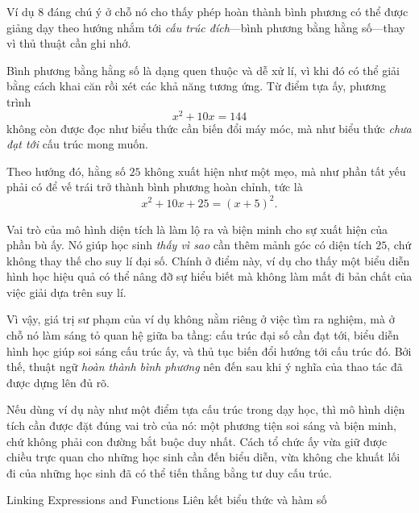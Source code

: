   {
    \vspace{.5\baselineskip}
    Ví dụ 8 đáng chú ý ở chỗ nó cho thấy phép hoàn thành bình phương có thể được giảng dạy theo hướng nhắm tới \emph{cấu trúc đích}---bình phương bằng hằng số---thay vì thủ thuật cần ghi nhớ.

    Bình phương bằng hằng số là dạng quen thuộc và dễ xử lí, vì khi đó có thể giải bằng cách khai căn rồi xét các khả năng tương ứng. Từ điểm tựa ấy, phương trình
    $$
    x^2+10x=144
    $$
    không còn được đọc như biểu thức cần biến đổi máy móc, mà như biểu thức \emph{chưa đạt tới} cấu trúc mong muốn.

    Theo hướng đó, hằng số $25$ không xuất hiện như một mẹo, mà như phần tất yếu phải có để vế trái trở thành bình phương hoàn chỉnh, tức là
    $$
    x^2+10x+25=(x+5)^2.
    $$

    Vai trò của mô hình diện tích là làm lộ ra và biện minh cho sự xuất hiện của phần bù ấy. Nó giúp học sinh \emph{thấy vì sao} cần thêm mảnh góc có diện tích $25$, chứ không thay thế cho suy lí đại số. Chính ở điểm này, ví dụ cho thấy một biểu diễn hình học hiệu quả có thể nâng đỡ sự hiểu biết mà không làm mất đi bản chất của việc giải dựa trên suy lí.

    Vì vậy, giá trị sư phạm của ví dụ không nằm riêng ở việc tìm ra nghiệm, mà ở chỗ nó làm sáng tỏ quan hệ giữa ba tầng: cấu trúc đại số cần đạt tới, biểu diễn hình học giúp soi sáng cấu trúc ấy, và thủ tục biến đổi hướng tới cấu trúc đó. Bởi thế, thuật ngữ \emph{hoàn thành bình phương} nên đến sau khi ý nghĩa của thao tác đã được dựng lên đủ rõ.

    Nếu dùng ví dụ này như một điểm tựa cấu trúc trong dạy học, thì mô hình diện tích cần được đặt đúng vai trò của nó: một phương tiện soi sáng và biện minh, chứ không phải con đường bắt buộc duy nhất. Cách tổ chức ấy vừa giữ được chiều trực quan cho những học sinh cần đến biểu diễn, vừa không che khuất lối đi của những học sinh đã có thể tiến thẳng bằng tư duy cấu trúc.
  }

\ParallelSection
  {Linking Expressions and Functions}
  {Liên kết biểu thức và hàm số}
  {}

\TriPara
  {
  }
  {
  }{\NOTE{}}

